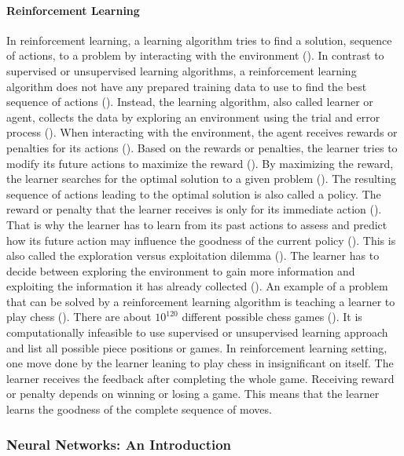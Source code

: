 \documentclass{BachelorBUI}
\begin{document}
            \paragraph{Reinforcement Learning}

                In reinforcement learning, a learning algorithm tries to find a solution, sequence of actions, to a problem by interacting with the environment (\cite{Alpaydin:2014}). In contrast to supervised or unsupervised learning algorithms, a reinforcement learning algorithm does not have any prepared training data to use to find the best sequence of actions (\cite{Mohri:2018}). Instead, the learning algorithm, also called learner or agent, collects the data by exploring an environment using the trial and error process (\cite{Bishop:2006}). When interacting with the environment, the agent receives rewards or penalties for its actions (\cite{Alpaydin:2014}). Based on the rewards or penalties, the learner tries to modify its future actions to maximize the reward (\cite{Mohri:2018}). By maximizing the reward, the learner searches for the optimal solution to a given problem (\cite{Bishop:2006}). The resulting sequence of actions leading to the optimal solution is also called a policy. The reward or penalty that the learner receives is only for its immediate action (\cite{Mohri:2018}). That is why the learner has to learn from its past actions to assess and predict how its future action may influence the goodness of the current policy (\cite{Alpaydin:2014}). This is also called the exploration versus exploitation dilemma (\cite{Alpaydin:2014}). The learner has to decide between exploring the environment to gain more information and exploiting the information it has already collected (\cite{Alpaydin:2014}). An example of a problem that can be solved by a reinforcement learning algorithm is teaching a learner to play chess (\cite{Alpaydin:2014}). There are about $10^{120}$ different possible chess games (\cite{Shannon:1988}). It is computationally infeasible to use supervised or unsupervised learning approach and list all possible piece positions or games. In reinforcement learning setting, one move done by the learner leaning to play chess in insignificant on itself. The learner receives the feedback after completing the whole game. Receiving reward or penalty depends on winning or losing a game. This means that the learner learns the goodness of the complete sequence of moves.

        \subsubsection{Neural Networks: An Introduction}
\end{document}

